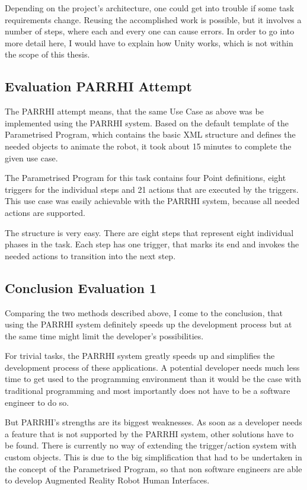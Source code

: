 Depending on the project's architecture, one could get into trouble if some task requirements change. Reusing the accomplished work is possible, but it involves a number of steps, where each and every one can cause errors. In order to go into more detail here, I would have to explain how Unity works, which is not within the scope of this thesis. 

\subsection{Evaluation PARRHI Attempt}
The PARRHI attempt means, that the same Use Case as above was be implemented using the PARRHI system. Based on the default template of the Parametrised Program, which contains the basic XML structure and defines the needed objects to animate the robot, it took about 15 minutes to complete the given use case.

The Parametrised Program for this task contains four Point definitions, eight triggers for the individual steps and 21 actions that are executed by the triggers. This use case was easily achievable with the PARRHI system, because all needed actions are supported. 

The structure is very easy. There are eight steps that represent eight individual phases in the task. Each step has one trigger, that marks its end and invokes the needed actions to transition into the next step. 

\subsection{Conclusion Evaluation 1}
Comparing the two methods described above, I come to the conclusion, that using the PARRHI system definitely speeds up the development process but at the same time might limit the developer's possibilities. 

For trivial tasks, the PARRHI system greatly speeds up and simplifies the development process of these applications. A potential developer needs much less time to get used to the programming environment than it would be the case with traditional programming and most importantly does not have to be a software engineer to do so.

But PARRHI's strengths are its biggest weaknesses. As soon as a developer needs a feature that is not supported by the PARRHI system, other solutions have to be found. There is currently no way of extending the trigger/action system with custom objects. This is due to the big simplification that had to be undertaken in the concept of the Parametrised Program, so that non software engineers are able to develop Augmented Reality Robot Human Interfaces. 

